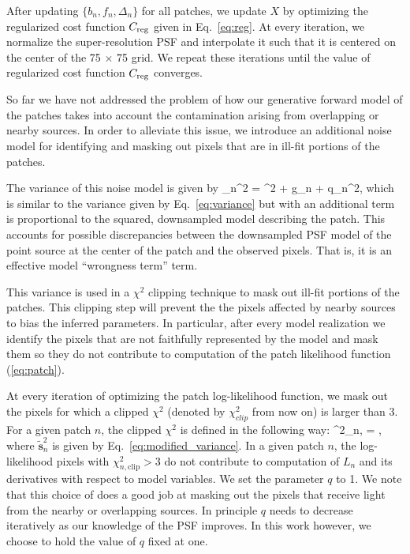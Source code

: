 After updating $\{b_n, f_n, \Delta_n\}$ for all patches, we update $X$ 
by optimizing the regularized cost function $C_{\rm reg}$ given in Eq.~\ref{eq:reg}. At every iteration, we normalize the super-resolution PSF and 
interpolate it such that it is centered on the center of the 75 $\times$ 75 grid. We repeat these iterations until the value of regularized cost function 
$C_{\rm reg}$ converges.

So far we have not addressed the problem of how our generative forward model of the patches takes into account the contamination arising from overlapping 
or nearby sources. In order to alleviate this issue, we introduce an additional noise model for identifying and masking out pixels that are 
in ill-fit portions of the patches.

The variance of this noise model is given by
\beq
{}_n^2 = \sigma^{2} + g_{n} + q_{n}^{2},
\label{eq:modified_variance}
\eeq 
which is similar to the variance given by Eq.~\ref{eq:variance} but with an additional term is 
proportional to the squared, downsampled model describing the patch. This accounts for possible discrepancies between the downsampled PSF model of the 
point source at the center of the patch and the observed pixels. That is, it is an effective model ``wrongness term'' term. 

This variance is used in a $\chi^2$ clipping technique to mask out ill-fit portions of the patches. 
This clipping step will prevent the the pixels affected by nearby sources to bias the inferred parameters.
In particular, after every model realization we identify the pixels that are not faithfully represented by the model and mask them so they do not 
contribute to computation of the patch likelihood function (\ref{eq:patch}).
 
At every iteration of optimizing the patch log-likelihood function, we mask out the pixels for which a clipped $\chi^{2}$ 
(denoted by $\chi^{2}_{clip}$ from now on) is larger than 3. For a given patch $n$, the clipped $\chi^{2}$ is defined in the following way:
\beq
\chi^{2}_{n,} = , 
\label{eq:chi_clip}
\eeq
where $\tilde{\mathbf{s}}_{n}^{2}$ is given by Eq.~\ref{eq:modified_variance}. In a given patch $n$, the log-likelihood pixels with $\chi^{2}_{n,\mathrm{clip}} > 3$ 
do not contribute to computation of $L_n$ and its derivatives with respect to model variables. 
We set the parameter $q$ to 1. We note that this choice of does a good job at masking out the pixels that receive light from the nearby or overlapping sources. 
In principle $q$ needs to decrease iteratively as our knowledge of the PSF improves. In this work however, we choose to hold the value of $q$ fixed at one. 


